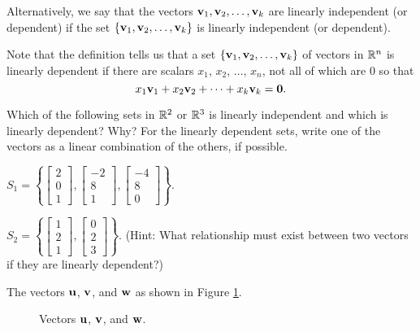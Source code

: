 Alternatively, we say that the vectors $\mathbf{v}_1, \mathbf{v}_2, \ldots, \mathbf{v}_k$ are linearly independent (or dependent) if the set $\{\mathbf{v}_1, \mathbf{v}_2, \ldots, \mathbf{v}_k\}$ is linearly independent (or dependent).


Note that the definition tells us that a set $\{\mathbf{v}_1, \mathbf{v}_2, \ldots, \mathbf{v}_k\}$ of vectors in $\mathbb{R}^n$ is linearly dependent if there are scalars $x_1$, $x_2$, $\ldots$, $x_n$, not all of which are 0 so that
\[x_1 \mathbf{v}_1 + x_2 \mathbf{v}_2 + \cdots + x_k \mathbf{v}_k = \mathbf{0}.\]


\begin{activity} \label{act:1_f_1} Which of the following sets in $\mathbb{R}^2$ or $\mathbb{R}^3$ is linearly independent and which is linearly dependent? Why? For the linearly dependent sets, write one of the vectors as a linear combination of the others, if possible. 
\ba
\item $S_1 = \left\{\left[\begin{array}{c} 2 \\ 0 \\ 1 \end{array}\right], \left[\begin{array}{r} -2 \\ 8 \\ 1 \end{array}\right], \left[\begin{array}{r} -4 \\ 8 \\ 0 \end{array}\right]\right\}$.



\item $S_2 = \left\{\left[\begin{array}{c} 1 \\ 2 \\ 1 \end{array}\right], \left[\begin{array}{c} 0 \\ 2 \\ 3 \end{array}\right]\right\}$. (Hint: What relationship must exist between two vectors if they are linearly dependent?)



\item The vectors $\mathbf{u}$, $\mathbf{v}$, and $\mathbf{w}$ as shown in Figure \ref{F:1_f_1}.
\begin{figure}[ht]
\begin{center}
\caption{Vectors $\mathbf{u}$, $\mathbf{v}$, and $\mathbf{w}$.}
\label{F:1_f_1}
\end{center}
\end{figure}


\ea

\end{activity}


